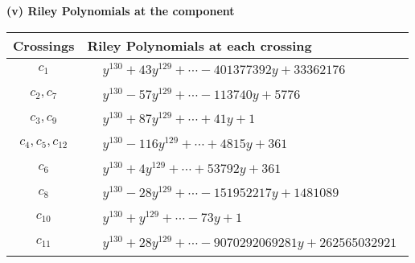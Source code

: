 \documentclass[1p]{elsarticle_modified}
\theoremstyle{definition}
\begin{document}
\newpage\renewcommand{\arraystretch}{1}
\flushleft \textbf{(v) Riley Polynomials at the component}\newline \\
\begin{tabular}{m{50pt}|m{274pt}}
Crossings & \hspace{64pt}Riley Polynomials at each crossing \\
\hline $$\begin{aligned}c_{1}\end{aligned}$$&$\begin{aligned}
&y^{130}+43 y^{129}+\cdots-401377392 y+33362176
\end{aligned}$\\
\hline $$\begin{aligned}c_{2},c_{7}\end{aligned}$$&$\begin{aligned}
&y^{130}-57 y^{129}+\cdots-113740 y+5776
\end{aligned}$\\
\hline $$\begin{aligned}c_{3},c_{9}\end{aligned}$$&$\begin{aligned}
&y^{130}+87 y^{129}+\cdots+41 y+1
\end{aligned}$\\
\hline $$\begin{aligned}c_{4},c_{5},c_{12}\end{aligned}$$&$\begin{aligned}
&y^{130}-116 y^{129}+\cdots+4815 y+361
\end{aligned}$\\
\hline $$\begin{aligned}c_{6}\end{aligned}$$&$\begin{aligned}
&y^{130}+4 y^{129}+\cdots+53792 y+361
\end{aligned}$\\
\hline $$\begin{aligned}c_{8}\end{aligned}$$&$\begin{aligned}
&y^{130}-28 y^{129}+\cdots-151952217 y+1481089
\end{aligned}$\\
\hline $$\begin{aligned}c_{10}\end{aligned}$$&$\begin{aligned}
&y^{130}+y^{129}+\cdots-73 y+1
\end{aligned}$\\
\hline $$\begin{aligned}c_{11}\end{aligned}$$&$\begin{aligned}
&y^{130}+28 y^{129}+\cdots-9070292069281 y+262565032921
\end{aligned}$\\
\hline
\end{tabular}\\~\\
\end{document}
